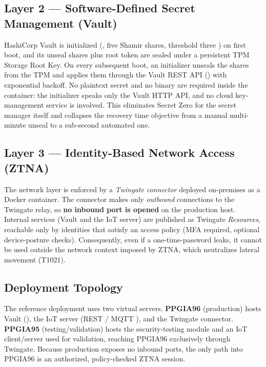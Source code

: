\documentclass[journal]{IEEEtran}
\newcommand{\ttcmd}[1]{\texttt{\seqsplit{#1}}}
\begin{document}
\subsection{Layer 2 --- Software-Defined Secret Management (Vault)}
HashiCorp Vault is initialized (\ttcmd{sys/init}, five Shamir shares, threshold
three \cite{shamir1979}) on first boot, and its unseal shares plus root token
are sealed under a persistent TPM Storage Root Key. On every subsequent boot,
an initializer unseals the shares from the TPM and applies them through the
Vault REST API (\ttcmd{sys/unseal}) with exponential backoff. No plaintext
secret and no \ttcmd{vault} binary are required inside the container: the
initializer speaks only the Vault HTTP API, and no cloud key-management service
is involved. This eliminates Secret Zero for the secret manager itself and
collapses the recovery time objective from a manual multi-minute unseal to a
sub-second automated one.

\subsection{Layer 3 --- Identity-Based Network Access (ZTNA)}
The network layer is enforced by a \emph{Twingate connector}
\cite{twingate2024} deployed on-premises as a Docker container. The connector makes only \emph{outbound}
connections to the Twingate relay, so \textbf{no inbound port is opened} on the
production host. Internal services (Vault and the IoT server) are published as
Twingate \emph{Resources}, reachable only by identities that satisfy an
access policy (MFA required, optional device-posture checks). Consequently,
even if a one-time-password leaks, it cannot be used outside the network
context imposed by ZTNA, which neutralizes lateral movement (T1021).

\subsection{Deployment Topology}
The reference deployment uses two virtual servers.
\textbf{PPGIA96} (production) hosts Vault (\ttcmd{:8200}), the IoT server
(REST \ttcmd{:5000} / MQTT \ttcmd{:8883}), and the Twingate connector.
\textbf{PPGIA95} (testing/validation) hosts the security-testing module and an
IoT client/server used for validation, reaching PPGIA96 exclusively through
Twingate. Because production exposes no inbound ports, the only path into
PPGIA96 is an authorized, policy-checked ZTNA session.

\end{document}
